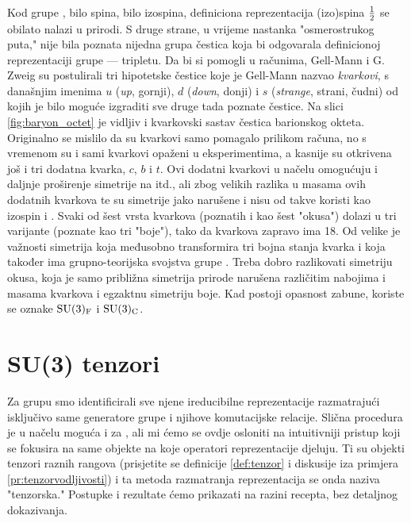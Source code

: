 Kod grupe , bilo spina, bilo izospina, definiciona reprezentacija
(izo)spina $\frac{1}{2}$ se obilato nalazi u prirodi. S druge strane,
u vrijeme nastanka "osmerostrukog puta," nije bila poznata nijedna
grupa čestica koja bi odgovarala definicionoj reprezentaciji grupe
 --- tripletu. Da bi si pomogli u računima, Gell-Mann i
G. Zweig su postulirali tri hipotetske čestice koje je Gell-Mann nazvao
\emph{kvarkovi}, s današnjim imenima $u$ (\emph{up}, gornji), $d$
(\emph{down}, donji) i $s$ (\emph{strange}, strani, čudni) od kojih
je bilo moguće izgraditi sve druge tada poznate čestice. Na slici
\ref{fig:baryon_octet} je vidljiv i kvarkovski sastav čestica barionskog
okteta.
Originalno se mislilo da su kvarkovi samo pomagalo prilikom računa,
no s vremenom su i sami kvarkovi opaženi u eksperimentima, a kasnije
su otkrivena još i tri dodatna kvarka, $c$, $b$ i $t$. Ovi dodatni
kvarkovi u načelu omogućuju i daljnje proširenje simetrije
na  itd., ali zbog velikih razlika u masama ovih dodatnih kvarkova
te su simetrije jako narušene i nisu od takve koristi kao
izospin i .
Svaki od šest vrsta kvarkova (poznatih i kao šest "okusa") 
dolazi u tri varijante (poznate kao tri "boje"), tako da kvarkova
zapravo ima 18. Od velike je važnosti simetrija koja međusobno
transformira tri bojna stanja kvarka i koja također ima grupno-teorijska
svojstva grupe . 
Treba dobro razlikovati simetriju  okusa, koja je samo približna
simetrija prirode narušena različitim nabojima i masama kvarkova
i egzaktnu simetriju  boje. Kad postoji opasnost zabune,
koriste se oznake $\mathrm{SU}(3)_{\mathrm{F}}$ i $\mathrm{SU}(3)_{\mathrm{C}}$.


\section{SU(3) tenzori}

Za grupu  smo identificirali sve njene ireducibilne reprezentacije
razmatrajući isključivo same generatore grupe i njihove komutacijske relacije.
Slična procedura je u načelu moguća i za , ali mi ćemo se ovdje osloniti
na intuitivniji pristup koji se fokusira na same objekte na koje operatori
reprezentacije djeluju. Ti su objekti  tenzori raznih rangova
(prisjetite se definicije \ref{def:tenzor} i diskusije iza primjera
\ref{pr:tenzorvodljivosti})
i ta metoda razmatranja reprezentacija se onda naziva "tenzorska."
Postupke i rezultate ćemo prikazati na razini recepta, bez detaljnog dokazivanja.


